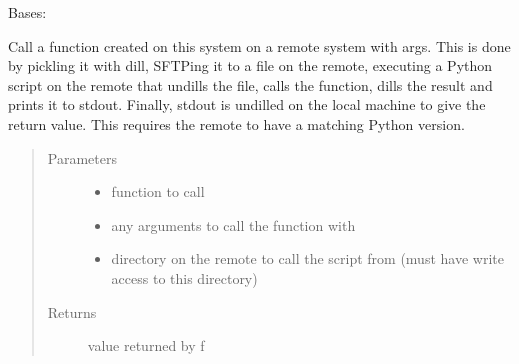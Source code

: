 \documentclass[letterpaper,12pt,english]{sphinxmanual}
\begin{document}
\begin{fulllineitems}
\label{\detokenize{PARyOpt.evaluators:PARyOpt.evaluators.connection.Connection}}
\sphinxAtStartPar
Bases: 

\begin{fulllineitems}
\label{\detokenize{PARyOpt.evaluators:PARyOpt.evaluators.connection.Connection.call_on_remote}}
\sphinxAtStartPar
Call a function created on this system on a remote system with args.
This is done by pickling it with dill, SFTPing it to a file on the remote, executing a Python script on the
remote that un\sphinxhyphen{}dills the file, calls the function, dills the result and prints it to stdout.
Finally, stdout is un\sphinxhyphen{}dilled on the local machine to give the return value.
This requires the remote to have a matching Python version.
\begin{quote}\begin{description}
\item[{Parameters}] \leavevmode\begin{itemize}
\item {} 
\sphinxAtStartPar
{} \textendash{} function to call

\item {} 
\sphinxAtStartPar
{} \textendash{} any arguments to call the function with

\item {} 
\sphinxAtStartPar
{} \textendash{} directory on the remote to call the script from (must have write access to this directory)

\end{itemize}

\item[{Returns}] \leavevmode
\sphinxAtStartPar
value returned by f


\end{description}
\end{quote}
\end{fulllineitems}
\end{fulllineitems}
\end{document}
